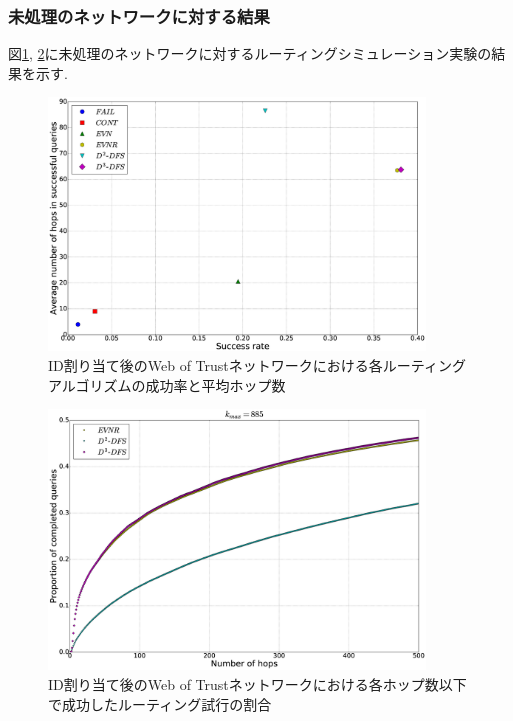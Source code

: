 \documentclass[dvipdfmx]{ampbt}
\begin{document}
   \subsubsection{未処理のネットワークに対する結果}
   図\ref{fig:succ_hops_full}, \ref{fig:cml_noclip}に未処理のネットワークに対するルーティングシミュレーション実験の結果を示す. 
   \begin{figure}[!h]
    \centerline{\includegraphics[width=100mm]{../fig/succ_hops_full.eps}}
    \caption{ID割り当て後のWeb of Trustネットワークにおける各ルーティングアルゴリズムの成功率と平均ホップ数}
    \label{fig:succ_hops_full}
   \end{figure}
   \begin{figure}[!h]
    \centerline{\includegraphics[width=100mm]{../fig/cml_noclip.eps}}
    \caption{ID割り当て後のWeb of Trustネットワークにおける各ホップ数以下で成功したルーティング試行の割合}
    \label{fig:cml_noclip}
   \end{figure}
\end{document}

